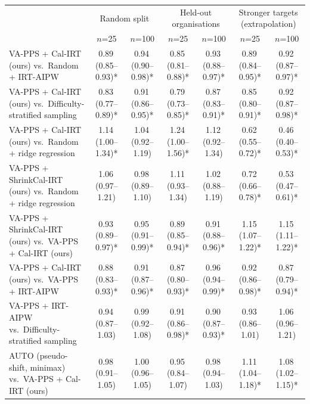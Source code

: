 \begin{tabular}{lcccccc}
\toprule
 & \multicolumn{2}{c}{Random split} & \multicolumn{2}{c}{Held-out organisations} & \multicolumn{2}{c}{Stronger targets (extrapolation)} \\
 & $n$=25 & $n$=100 & $n$=25 & $n$=100 & $n$=25 & $n$=100 \\
\midrule
VA-PPS + Cal-IRT (ours) vs.\ Random + IRT-AIPW & 0.89\,\scriptsize(0.85--0.93)* & 0.94\,\scriptsize(0.90--0.98)* & 0.85\,\scriptsize(0.81--0.88)* & 0.93\,\scriptsize(0.88--0.97)* & 0.89\,\scriptsize(0.84--0.95)* & 0.92\,\scriptsize(0.87--0.97)* \\
VA-PPS + Cal-IRT (ours) vs.\ Difficulty-stratified sampling & 0.83\,\scriptsize(0.77--0.89)* & 0.91\,\scriptsize(0.86--0.95)* & 0.79\,\scriptsize(0.73--0.85)* & 0.87\,\scriptsize(0.83--0.91)* & 0.85\,\scriptsize(0.80--0.91)* & 0.92\,\scriptsize(0.87--0.98)* \\
VA-PPS + Cal-IRT (ours) vs.\ Random + ridge regression & 1.14\,\scriptsize(1.00--1.34)* & 1.04\,\scriptsize(0.92--1.19) & 1.24\,\scriptsize(1.00--1.56)* & 1.12\,\scriptsize(0.92--1.34) & 0.62\,\scriptsize(0.55--0.72)* & 0.46\,\scriptsize(0.40--0.53)* \\
VA-PPS + ShrinkCal-IRT (ours) vs.\ Random + ridge regression & 1.06\,\scriptsize(0.97--1.21) & 0.98\,\scriptsize(0.89--1.10) & 1.11\,\scriptsize(0.93--1.34) & 1.02\,\scriptsize(0.88--1.19) & 0.72\,\scriptsize(0.66--0.78)* & 0.53\,\scriptsize(0.47--0.61)* \\
VA-PPS + ShrinkCal-IRT (ours) vs.\ VA-PPS + Cal-IRT (ours) & 0.93\,\scriptsize(0.89--0.97)* & 0.95\,\scriptsize(0.91--0.99)* & 0.89\,\scriptsize(0.85--0.94)* & 0.91\,\scriptsize(0.88--0.96)* & 1.15\,\scriptsize(1.07--1.22)* & 1.15\,\scriptsize(1.11--1.22)* \\
VA-PPS + Cal-IRT (ours) vs.\ VA-PPS + IRT-AIPW & 0.88\,\scriptsize(0.83--0.93)* & 0.91\,\scriptsize(0.87--0.96)* & 0.87\,\scriptsize(0.80--0.93)* & 0.96\,\scriptsize(0.94--0.99)* & 0.92\,\scriptsize(0.86--0.98)* & 0.87\,\scriptsize(0.79--0.94)* \\
VA-PPS + IRT-AIPW vs.\ Difficulty-stratified sampling & 0.94\,\scriptsize(0.87--1.03) & 0.99\,\scriptsize(0.92--1.08) & 0.91\,\scriptsize(0.86--0.98)* & 0.90\,\scriptsize(0.87--0.93)* & 0.93\,\scriptsize(0.86--1.01) & 1.06\,\scriptsize(0.96--1.21) \\
AUTO (pseudo-shift, minimax) vs.\ VA-PPS + Cal-IRT (ours) & 0.98\,\scriptsize(0.91--1.05) & 1.00\,\scriptsize(0.96--1.05) & 0.95\,\scriptsize(0.84--1.07) & 0.98\,\scriptsize(0.94--1.03) & 1.11\,\scriptsize(1.04--1.18)* & 1.08\,\scriptsize(1.02--1.15)* \\
\bottomrule
\end{tabular}
